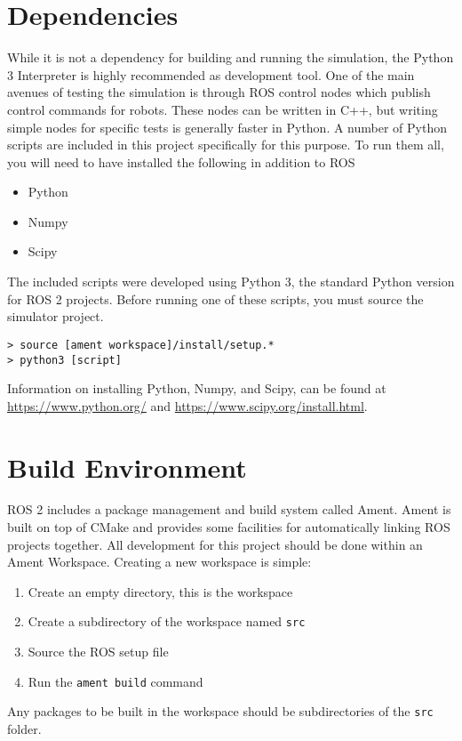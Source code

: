 \section{Dependencies}
While it is not a dependency for building and running the simulation, the Python 3 Interpreter is highly recommended as development tool. One of the main avenues of testing the simulation is through ROS control nodes which publish control commands for robots. These nodes can be written in C++, but writing simple nodes for specific tests is generally faster in Python. A number of Python scripts are included in this project specifically for this purpose. To run them all, you will need to have installed the following in addition to ROS
\begin{itemize}
	\item Python
	\item Numpy
	\item Scipy
\end{itemize}
The included scripts were developed using Python 3, the standard Python version for ROS 2 projects.
Before running one of these scripts, you must source the simulator project.
\begin{lstlisting}
> source [ament workspace]/install/setup.*
> python3 [script]
\end{lstlisting}

Information on installing Python, Numpy, and Scipy, can be found at \url{https://www.python.org/} and \url{https://www.scipy.org/install.html}.

\section{Build  Environment} \label{sec:buildenv}
ROS 2 includes a package management and build system called Ament. Ament is built on top of CMake and provides some facilities for automatically linking ROS projects together.
All development for this project should be done within an Ament Workspace. Creating a new workspace is simple:
\begin{enumerate}
	\item Create an empty directory, this is the workspace
	\item Create a subdirectory of the workspace named \lstinline|src|
	\item Source the ROS setup file
	\item Run the \lstinline|ament build| command
\end{enumerate}
Any packages to be built in the workspace should be subdirectories of the \lstinline|src| folder.

